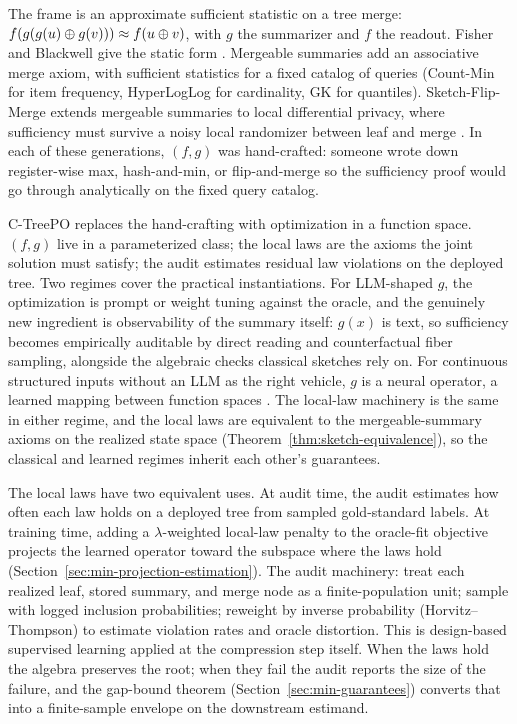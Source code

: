 The frame is an approximate sufficient statistic on a tree merge:
$f(g(g(u)\oplus g(v))) \approx f(u\oplus v)$, with $g$ the
summarizer and $f$ the readout. Fisher and Blackwell give the static
form \citep{Fisher1922,Blackwell1953}. Mergeable summaries
\citep{Agarwal2013MergeableTODS,FlajoletEtAl2007,CormodeMuthukrishnan2005}
add an associative merge axiom, with sufficient statistics for a fixed
catalog of queries (Count-Min for item frequency, HyperLogLog for
cardinality, GK for quantiles). Sketch-Flip-Merge extends mergeable
summaries to local differential privacy, where sufficiency must
survive a noisy local randomizer between leaf and merge
\citep{HehirTingCormode2023SFM}. In each of these generations, $(f,
g)$ was hand-crafted: someone wrote down register-wise max,
hash-and-min, or flip-and-merge so the sufficiency proof would go
through analytically on the fixed query catalog.

C-TreePO replaces the hand-crafting with optimization in a function
space. $(f, g)$ live in a parameterized class; the local laws are the
axioms the joint solution must satisfy; the audit estimates residual
law violations on the deployed tree. Two regimes cover the
practical instantiations. For LLM-shaped $g$, the optimization is
prompt or weight tuning against the oracle, and the genuinely new
ingredient is observability of the summary itself: $g(x)$ is text, so
sufficiency becomes empirically auditable by direct reading and
counterfactual fiber sampling, alongside the algebraic checks
classical sketches rely on. For continuous structured inputs without
an LLM as the right vehicle, $g$ is a neural operator, a learned
mapping between function spaces \citep{Kovachki23NeuralOperator,Li21FNO}.
The local-law machinery is the same in either regime, and the local
laws are equivalent to the mergeable-summary axioms on the realized
state space (Theorem~\ref{thm:sketch-equivalence}), so the classical
and learned regimes inherit each other's guarantees.

The local laws have two equivalent uses. At audit time, the audit
estimates how often each law holds on a deployed tree from sampled
gold-standard labels. At training time, adding a $\lambda$-weighted
local-law penalty to the oracle-fit objective projects the learned
operator toward the subspace where the laws hold
(Section~\ref{sec:min-projection-estimation}). The audit machinery: treat each
realized leaf, stored summary, and merge node as a finite-population
unit; sample with logged inclusion probabilities; reweight by inverse
probability (Horvitz--Thompson) to estimate violation rates and oracle
distortion. This is design-based supervised
learning applied at the compression step itself. When the laws hold the
algebra preserves the root; when they fail the audit reports the size
of the failure, and the gap-bound theorem
(Section~\ref{sec:min-guarantees}) converts that into a finite-sample
envelope on the downstream estimand.

